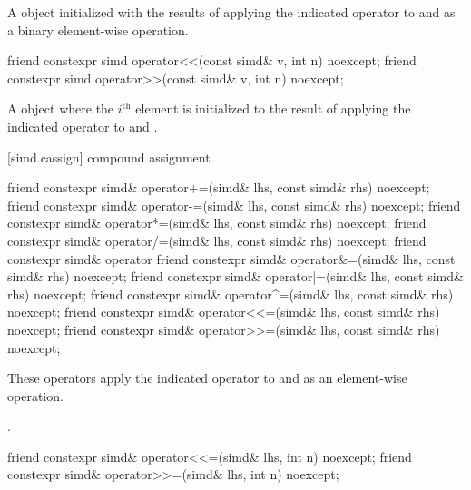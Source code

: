 \begin{itemdescr}
  \pnum\ConstraintOperatorTWellFormed

  \pnum\returns
  A  object initialized with the results of applying the indicated operator to  and  as a binary element-wise operation.
\end{itemdescr}

\begin{itemdecl}
friend constexpr simd operator<<(const simd& v, int n) noexcept;
friend constexpr simd operator>>(const simd& v, int n) noexcept;
\end{itemdecl}

\begin{itemdescr}
  \pnum\ConstraintOperatorTWellFormed

  \pnum\returns
  A  object where the $i^\text{th}$ element is initialized to the result of applying the indicated operator to  and  \foralli.
\end{itemdescr}

[simd.cassign]{ compound assignment}

\begin{itemdecl}
friend constexpr simd& operator+=(simd& lhs, const simd& rhs) noexcept;
friend constexpr simd& operator-=(simd& lhs, const simd& rhs) noexcept;
friend constexpr simd& operator*=(simd& lhs, const simd& rhs) noexcept;
friend constexpr simd& operator/=(simd& lhs, const simd& rhs) noexcept;
friend constexpr simd& operator%
friend constexpr simd& operator&=(simd& lhs, const simd& rhs) noexcept;
friend constexpr simd& operator|=(simd& lhs, const simd& rhs) noexcept;
friend constexpr simd& operator^=(simd& lhs, const simd& rhs) noexcept;
friend constexpr simd& operator<<=(simd& lhs, const simd& rhs) noexcept;
friend constexpr simd& operator>>=(simd& lhs, const simd& rhs) noexcept;
\end{itemdecl}

\begin{itemdescr}
  \pnum\ConstraintOperatorTWellFormed

  \pnum\effects
  These operators apply the indicated operator to  and  as an element-wise operation.

  \pnum\returns
  .
\end{itemdescr}

\begin{itemdecl}
friend constexpr simd& operator<<=(simd& lhs, int n) noexcept;
friend constexpr simd& operator>>=(simd& lhs, int n) noexcept;
\end{itemdecl}

